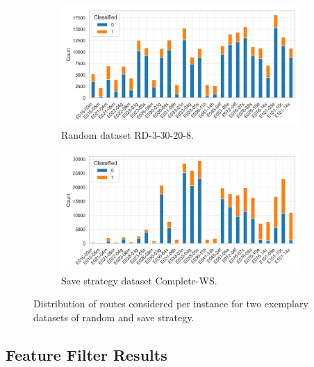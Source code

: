 \begin{figure}[ht]
    \centering
    \begin{subfigure}[t]{.5\textwidth}
        \centering
        \includegraphics[width=\linewidth]{pictures/dataset_structure/distribution_plot_RandomData_5_40_40_10.png}
        \caption{Random dataset RD-3-30-20-8.}
    \end{subfigure}%
    \begin{subfigure}[t]{.5\textwidth}
        \centering
        \includegraphics[width=\linewidth]{pictures/dataset_structure/distribution_plot_gendreau_28880_600_WS.png}
        \caption{Save strategy dataset Complete-WS.}
    \end{subfigure}
    \caption{Distribution of routes considered per instance for two exemplary datasets of random and save strategy.}
    \label{fig:comparison_noroutes_perInstancce}
\end{figure}

\subsection{Feature Filter Results}
\label{sec:feature_filter_results}

